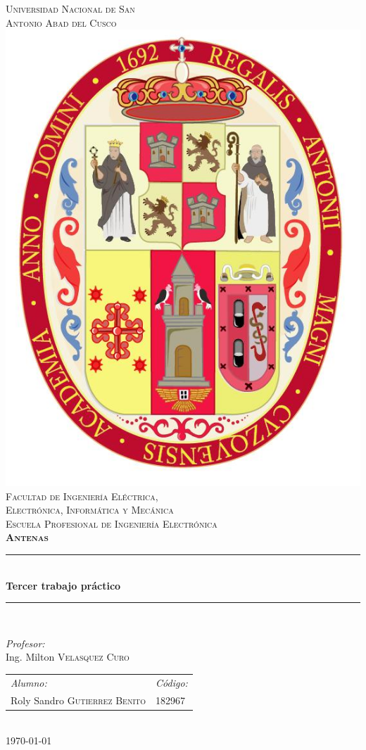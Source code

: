 \documentclass[11pt]{book}
\begin{document}
\begin{titlepage}
     \newcommand{\HRule}{\rule{\linewidth}{0.5mm}}
     \center
     \textsc{\LARGE  Universidad Nacional de San \\[0.2cm] Antonio Abad del Cusco}\\[1.5cm]
	 \includegraphics[scale=0.2]{escudo.jpg}\\[1cm]
     \textsc{\Large Facultad de Ingeniería Eléctrica, \\ Electrónica, Informática y Mecánica}\\[0.5cm]
     \textsc{\large Escuela Profesional de Ingeniería Electrónica}\\[0.5cm]
     \textsc{\Large \textbf{Antenas}}\\[0.3cm]
     \HRule \\[0.4cm]
     { \huge \bfseries Tercer trabajo práctico}\\[0.2cm]
	 \HRule\\[1.0cm]
     \begin{minipage}{\textwidth}
         \center
 
         \emph{Profesor:} \\
         Ing. Milton \textsc{Velasquez Curo} \\[1cm]
 
         \begin{tabular}{ll}
             \emph{Alumno:} & \emph{Código:}\\
             Roly Sandro \textsc{Gutierrez Benito} & 182967 \\
		 \end{tabular} \\[1cm]
		 \today
     \end{minipage}\\[2cm]
\end{titlepage}
\end{document}
